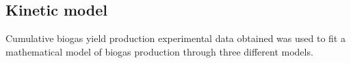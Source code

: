 \subsection{Kinetic model}
Cumulative biogas yield production experimental data obtained was used to fit a mathematical model of biogas production through three different models.